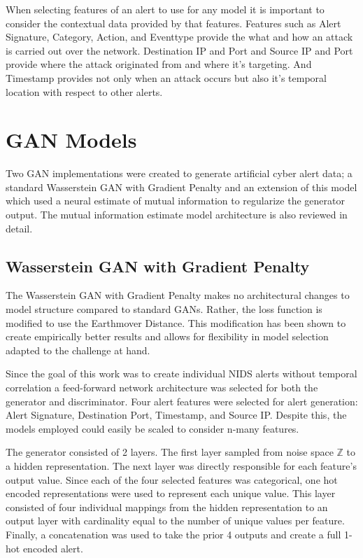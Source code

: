 When selecting features of an alert to use for any model it is important to consider the contextual data provided by that features. Features such as Alert Signature, Category, Action, and Eventtype provide the what and how an attack is carried out over the network. Destination IP and Port and Source IP and Port provide where the attack originated from and where it's targeting.  And Timestamp provides not only when an attack occurs but also it's temporal location with respect to other alerts.


\section{GAN Models}
\label{sec:model_arch}
Two GAN implementations were created to generate artificial cyber alert data; a standard Wasserstein GAN with Gradient Penalty and an extension of this model which used a neural estimate of mutual information to regularize the generator output. The mutual information estimate model architecture is also reviewed in detail.

\subsection{Wasserstein GAN with Gradient Penalty}
\label{sec:gan}
The Wasserstein GAN with Gradient Penalty makes no architectural changes to model structure compared to standard GANs. Rather, the loss function is modified to use the Earthmover Distance. This modification has been shown to create empirically better results and allows for flexibility in model selection adapted to the challenge at hand.

Since the goal of this work was to create individual NIDS alerts without temporal correlation a feed-forward network architecture was selected for both the generator and discriminator. Four alert features were selected for alert generation: Alert Signature, Destination Port, Timestamp, and Source IP. Despite this, the models employed could easily be scaled to consider n-many features. 

The generator consisted of 2 layers. The first layer sampled from noise space $\mathbb{Z}$ to a hidden representation. The next layer was directly responsible for each feature's output value. Since each of the four selected features was categorical, one hot encoded representations were used to represent each unique value. This layer consisted of four individual mappings from the hidden representation to an output layer with cardinality equal to the number of unique values per feature. Finally, a concatenation was used to take the prior 4 outputs and create a full 1-hot encoded alert. 

